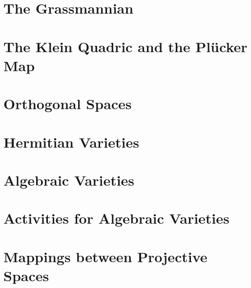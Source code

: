



\section{The Grassmannian}
\label{sec:grassmannian}






\bigskip

\clearpage



\section{The Klein Quadric and the Pl\"ucker Map}
\label{sec:klein}






\bigskip

\clearpage


\section{Orthogonal Spaces}
\label{sec:orthogonal}





\bigskip

\clearpage


\section{Hermitian Varieties}
\label{sec:hermitian}






\bigskip

\clearpage






\section{Algebraic Varieties}
\label{sec:algebraic:varieties}




\bigskip



\clearpage





\section{Activities for Algebraic Varieties}
\label{sec:algebraic:varieties:activities}




\bigskip



\clearpage




\section{Mappings between Projective Spaces}
\label{sec:mappings:between:projective:spaces}




\bigskip



\clearpage




